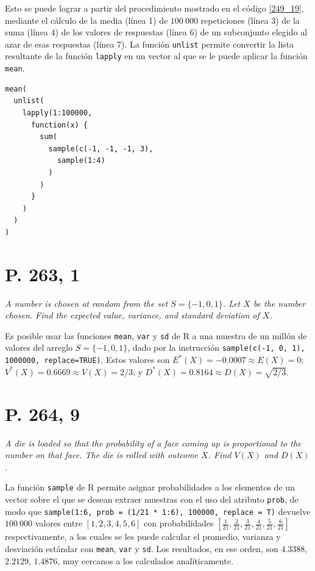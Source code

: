 \documentclass[paper=leter, fontsize=11pt]{scrartcl}
\begin{document}
Esto se puede lograr a partir del procedimiento mostrado en el código \ref{249_19}, mediante el cálculo de la media (línea 1) de $100\ 000$ repeticiones (línea 3) de la suma (línea 4) de los valores de respuestas (línea 6) de un subconjunto elegido al azar de esas respuestas (línea 7). La función \texttt{unlist} permite convertir la lista resultante de la función \texttt{lapply} en un vector al que se le puede aplicar la función \texttt{mean}.

\begin{lstlisting}[caption={P. 249, 19}, captionpos=t, label=249_19]
mean(
  unlist(
    lapply(1:100000, 
      function(x) {
        sum(
          sample(c(-1, -1, -1, 3), 
            sample(1:4)
          )
        )
      }
    )
  )
)
\end{lstlisting}

\section*{P. 263, 1}
\emph{A number is chosen at random from the set \( S = \lbrace -1, 0, 1 \rbrace \). Let \(X\) be the number chosen. Find the expected value, variance, and standard deviation of \(X\).}

Es posible usar las funciones \texttt{mean}, \texttt{var} y \texttt{sd} de R a una muestra de un millón de valores del arreglo $S = \lbrace -1, 0, 1 \rbrace$, dado por la instrucción \texttt{sample(c(-1, 0, 1), 1000000, replace=TRUE)}. Estos valores son $E^*(X) = -0.0007 \approx E(X) = 0$; $V^*(X) = 0.6669 \approx V(X) = 2/3$; y $D^*(X) = 0.8164 \approx D(X) = \sqrt{2/3}$.

\section*{P. 264, 9}
\emph{A die is loaded so that the probability of a face coming up is proportional to the number on that face. The die is rolled with outcome $X$. Find $V(X)$ and $D(X)$.}

La función \texttt{sample} de R permite asignar probabilidades a los elementos de un vector sobre el que se desean extraer muestras con el uso del atributo \texttt{prob}, de modo que \texttt{sample(1:6, prob = (1/21 * 1:6), 100000, replace = T)} devuelve $100\ 000$ valores entre $[1, 2, 3, 4, 5, 6]$ con probabilidades $[\frac{1}{21}, \frac{2}{21}, \frac{3}{21}, \frac{4}{21}, \frac{5}{21}, \frac{6}{21}]$ respectivamente, a los cuales se les puede calcular el promedio, varianza y desviación estándar con \texttt{mean}, \texttt{var} y \texttt{sd}. Los resultados, en ese orden, son $4.3388$, $2.2129$, $1.4876$, muy cercanos a los calculados analíticamente.
\end{document}
